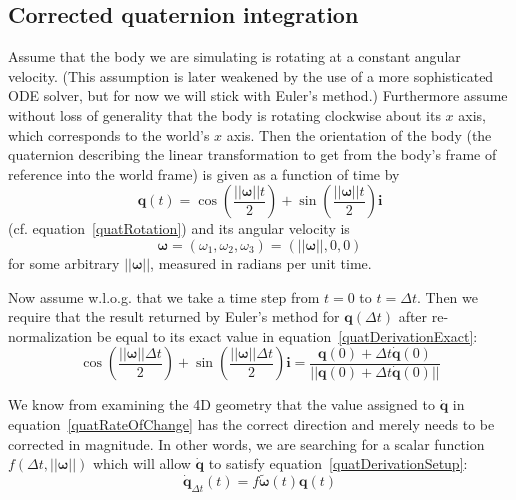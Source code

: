 \subsection{Corrected quaternion integration\label{quatIntegrationDerivation}}

Assume that the body we are simulating is rotating at a constant angular velocity.
(This assumption is later weakened by the use of a more sophisticated ODE solver,
but for now we will stick with Euler's method.) Furthermore assume without loss of
generality that the body is rotating clockwise about its $x$ axis, which corresponds
to the world's $x$ axis. Then the orientation of the body (the quaternion describing
the linear transformation to get from the body's frame of reference into the world
frame) is given as a function of time by
\begin{equation}
\label{quatDerivationExact}
\mathbf{q}(t) = \cos\left(\frac{||\bm{\omega}||t}{2}\right) +
    \sin\left(\frac{||\bm{\omega}||t}{2}\right)\mathbf{i}
\end{equation}
(cf. equation~\ref{quatRotation}) and its angular velocity is
\begin{equation}
\bm{\omega} = (\omega_1, \omega_2, \omega_3) = (||\bm{\omega}||, 0, 0)
\end{equation}
for some arbitrary $||\bm{\omega}||$, measured in radians per unit time.

Now assume w.l.o.g. that we take a time step from $t = 0$ to $t = \Delta t$.
Then we require that the result returned by Euler's method for $\mathbf{q}(\Delta t)$
after re-normalization be equal to its exact value in equation~\ref{quatDerivationExact}:
\begin{equation}
\label{quatDerivationSetup}
\cos\left(\frac{||\bm{\omega}||\Delta t}{2}\right) +
    \sin\left(\frac{||\bm{\omega}||\Delta t}{2}\right)\mathbf{i} =
    \frac{\mathbf{q}(0) + \Delta t \dot{\mathbf{q}}(0)}
        {||\mathbf{q}(0) + \Delta t \dot{\mathbf{q}}(0)||}
\end{equation}

We know from examining the 4D geometry that the value assigned to $\dot{\mathbf{q}}$
in equation~\ref{quatRateOfChange} has the correct direction and merely needs to be
corrected in magnitude. In other words, we are searching for a scalar function
$f(\Delta t, ||\bm{\omega}||)$ which will allow $\dot{\mathbf{q}}$ to satisfy
equation~\ref{quatDerivationSetup}:
\begin{equation}
\dot{\mathbf{q}}_{\Delta t}(t) = f\tilde{\bm{\omega}}(t)\mathbf{q}(t)
\end{equation}

